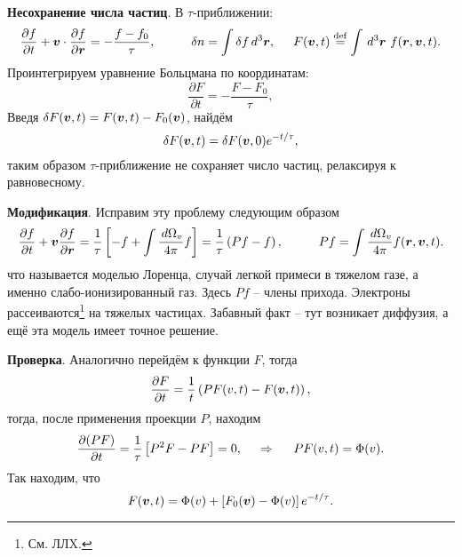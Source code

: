

\textbf{Несохранение числа частиц}. 
В $\tau$-приближении:
\begin{equation*}
	\frac{\partial f}{\partial t}  + \vc{v} \cdot \frac{\partial f}{\partial \vc{r}} = - \frac{f-f_0}{\tau},
	\hspace{10 mm} 
	\delta n = \int \delta f \d^3 \vc{r},
	\hspace{5 mm} 
	F(\vc{v}, t) \overset{\mathrm{def}}{=} \int \d^3 \vc{r}\ f(\vc{r}, \vc{v}, t).
\end{equation*}
Проинтегрируем уравнение Больцмана по координатам:
\begin{equation*}
	\frac{\partial F}{\partial t} = - \frac{F-F_0}{\tau},
\end{equation*}
Введя $\delta F (\boldsymbol{v}, t) = F(\boldsymbol{v}, t) - F_0 (\boldsymbol{v})$, найдём
\begin{equation*}
	\delta F(\boldsymbol{v}, t) = \delta F(\boldsymbol{v}, 0) e^{- t/\tau},
\end{equation*}
таким образом $\tau$-приближение не сохраняет число частиц, релаксируя к равновесному. 


\textbf{Модификация}. Исправим эту проблему следующим образом
\begin{equation*}
	\frac{\partial f}{\partial t} + \vc{v} \frac{\partial f}{\partial \vc{r}}  = \frac{1}{\tau} \left[
		- f + \int \frac{\d \Omega_v}{4\pi} f
	\right] = \frac{1}{\tau} \left(Pf - f\right),
	\hspace{10 mm} 
	P f = \int \frac{\d \Omega_v}{4\pi} f(\vc{r}, \vc{v}, t).
\end{equation*}
что называется моделью Лоренца, случай легкой примеси в тяжелом газе, а именно слабо-ионизированный газ. Здесь $Pf$ -- члены прихода.  Электроны рассеиваются\footnote{
	См. ЛЛX.
}  на тяжелых частицах.
Забавный факт -- тут возникает диффузия, а ещё эта модель имеет точное решение. 


\textbf{Проверка}. Аналогично перейдём к функции $F$, тогда
\begin{equation*}
	\frac{\partial F}{\partial t} = \frac{1}{t}\left(
		P F(v, t) - F(\boldsymbol{v}, t)
	\right),
\end{equation*}
тогда, после применения проекции $P$, находим
\begin{equation*}
	\frac{\partial (PF)}{\partial t}  = \frac{1}{\tau}\left[P^2 F - P F\right] = 0,
	\hspace{0.5cm} \Rightarrow \hspace{0.5cm}
	PF(v, t) = \Phi(v).
\end{equation*}
Так находим, что
\begin{equation*}
	F(\boldsymbol{v}, t) = \Phi(v) + \left[
		F_0 (\boldsymbol{v}) - \Phi(v)
	\right] e^{- t/\tau}.
\end{equation*}



